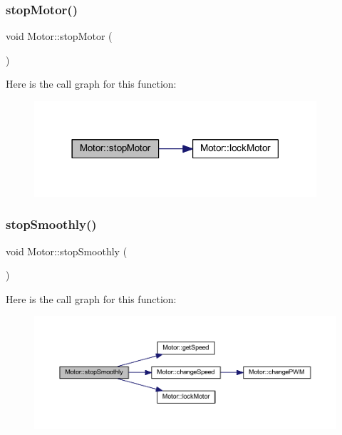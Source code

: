 \subsubsection{\texorpdfstring{stop\+Motor()}{stopMotor()}}
{\footnotesize\ttfamily void Motor\+::stop\+Motor (\begin{DoxyParamCaption}{ }\end{DoxyParamCaption})}

Here is the call graph for this function\+:
\nopagebreak
\begin{figure}[H]
\begin{center}
\leavevmode
\includegraphics[width=297pt]{d1/d6b/class_motor_a17eb92ef52d3cb10bc9f6b88b7c34dcc_cgraph}
\end{center}
\end{figure}
\mbox{\label{class_motor_af69697d5adb51106f4352c481d67fedd}} 
\subsubsection{\texorpdfstring{stop\+Smoothly()}{stopSmoothly()}}
{\footnotesize\ttfamily void Motor\+::stop\+Smoothly (\begin{DoxyParamCaption}{ }\end{DoxyParamCaption})}

Here is the call graph for this function\+:
\nopagebreak
\begin{figure}[H]
\begin{center}
\leavevmode
\includegraphics[width=350pt]{d1/d6b/class_motor_af69697d5adb51106f4352c481d67fedd_cgraph}
\end{center}
\end{figure}


